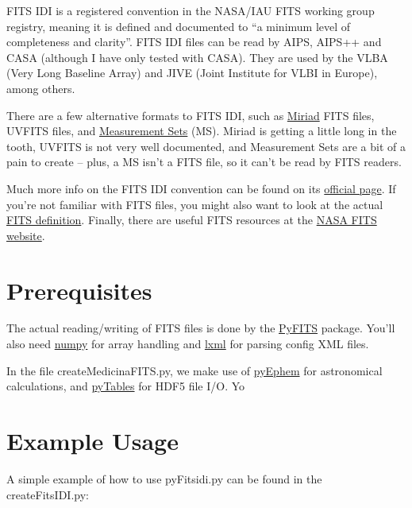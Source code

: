 \documentclass[letterpaper,10pt,english]{sphinxmanual}
\begin{document}
FITS IDI is a registered convention in the NASA/IAU FITS working group registry, meaning it is defined and documented to ``a minimum level of completeness and clarity''. FITS IDI files can be read by AIPS, AIPS++ and CASA (although I have only tested with CASA). They are used by the VLBA (Very Long Baseline Array) and JIVE (Joint Institute for VLBI in Europe), among others.

There are a few alternative formats to FITS IDI, such as \href{http://www.atnf.csiro.au/computing/software/miriad/}{Miriad} FITS files, UVFITS files, and \href{http://casa.nrao.edu/docs/userman/UserManse6.html}{Measurement Sets} (MS). Miriad is getting a little long in the tooth, UVFITS is not very well documented, and Measurement Sets are a bit of a pain to create -- plus, a MS isn't a FITS file, so it can't be read by FITS readers.

Much more info on the FITS IDI convention can be found on its \href{http://fits.gsfc.nasa.gov/registry/fitsidi.html}{official page}. If you're not familiar with FITS files, you might also want to look at the actual \href{http://www.aanda.org/index.php?option=com\_article\&access=doi\&doi=10.1051/0004-6361/201015362\&Itemid=129}{FITS definition}. Finally, there are useful FITS resources at the \href{http://fits.gsfc.nasa.gov/fits\_home.html}{NASA FITS website}.


\chapter{Prerequisites}
\label{index:prerequisites}
The actual reading/writing of FITS files is done by the \href{http://www.stsci.edu/resources/software\_hardware/pyfits}{PyFITS} package. You'll also need \href{http://numpy.scipy.org/}{numpy} for array handling and \href{http://lxml.de/}{lxml} for parsing config XML files.

In the file createMedicinaFITS.py, we make use of \href{http://rhodesmill.org/pyephem/}{pyEphem} for astronomical calculations, and \href{http://www.pytables.org/moin}{pyTables} for HDF5 file I/O. Yo


\chapter{Example Usage}
\label{index:example-usage}
A simple example of how to use pyFitsidi.py can be found in the createFitsIDI.py:
\end{document}
